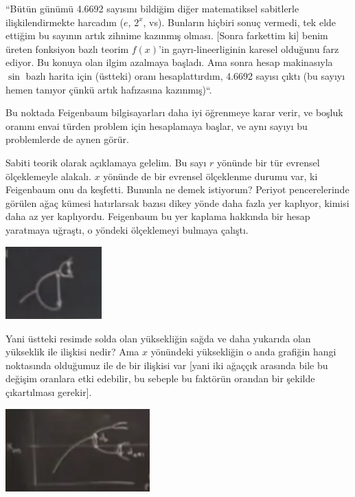 \documentclass[12pt,fleqn]{article}\usepackage{../../common}
\begin{document}
``Bütün günümü 4.6692 sayısını bildiğim diğer matematiksel sabitlerle
ilişkilendirmekte harcadım ($e$, $2^x$, vs). Bunların hiçbiri sonuç vermedi, tek
elde ettiğim bu sayının artık zihnime kazınmış olması. [Sonra farkettim ki]
benim üreten fonksiyon bazlı teorim $f(x)$'in gayrı-lineerliginin karesel
olduğunu farz ediyor. Bu konuya olan ilgim azalmaya başladı. Ama sonra hesap
makinasıyla $\sin$ bazlı harita için (üstteki) oranı hesaplattırdım, 4.6692
sayısı çıktı (bu sayıyı hemen tanıyor çünkü artık hafızasına kazınmış)``.

Bu noktada Feigenbaum bilgisayarları daha iyi öğrenmeye karar verir, ve boşluk
oranını envai türden problem için hesaplamaya başlar, ve aynı sayıyı bu
problemlerde de aynen görür.

Sabiti teorik olarak açıklamaya gelelim. Bu sayı $r$ yönünde bir tür evrensel
ölçeklemeyle alakalı. $x$ yönünde de bir evrensel ölçeklenme durumu var, ki
Feigenbaum onu da keşfetti. Bununla ne demek istiyorum? Periyot pencerelerinde
görülen ağaç kümesi hatırlarsak bazısı dikey yönde daha fazla yer kaplıyor,
kimisi daha az yer kaplıyordu. Feigenbaum bu yer kaplama hakkında bir hesap
yaratmaya uğraştı, o yöndeki ölçeklemeyi bulmaya çalıştı.

\includegraphics[width=10em]{20_04.png}

Yani üstteki resimde solda olan yüksekliğin sağda ve daha yukarıda olan
yükseklik ile ilişkisi nedir? Ama $x$ yönündeki yüksekliğin o anda grafiğin
hangi noktasında olduğumuz ile de bir ilişkisi var [yani iki ağaççık
arasında bile bu değişim oranlara etki edebilir, bu sebeple bu faktörün
orandan bir şekilde çıkartılması gerekir].

\includegraphics[width=15em]{20_06.png}
\end{document}

